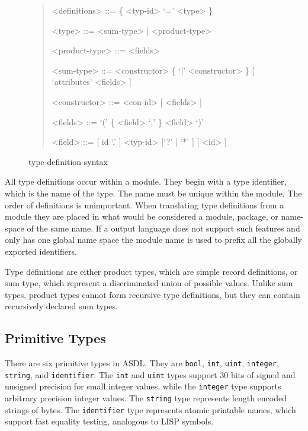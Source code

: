 \begin{figure}[t]
  \begin{quote}
    \begin{grammar}
      <definitions>  ::=  \{ <typ-id> `=' <type> \}

      <type>         ::= <sum-type> | <product-type>

      <product-type> ::= <fields>

      <sum-type>     ::= <constructor> \{ `|' <constructor> \} [ `attributes' <fields> ]

      <constructor>  ::= <con-id> [ <fields> ]

      <fields>       ::= `(' \{ <field>  `,' \} <field> `)'

      <field>        ::= [ id `.' ] <typ-id> [`?' | `*' ]  [ <id> ]
    \end{grammar}
  \end{quote}
  \caption{\asdl{} type definition syntax}
  \label{fig:type-syntax}
\end{figure}%

All type definitions occur within a module.  They begin with a type
identifier, which is the name of the type. The name must be unique within the
module. The order of definitions is unimportant. When translating type
definitions from a module they are placed in what would be considered a
module, package, or name-space of the same name. If a output language does
not support such features and only has one global name space the module name
is used to prefix all the globally exported identifiers.

Type definitions are either product types, which are simple record definitions,
or sum type, which represent a discriminated union of possible values. Unlike
sum types, product types cannot form recursive type definitions, but they can
contain recursively declared sum types.

\subsection{Primitive Types}
There are six primitive types in ASDL. They are
\lstinline!bool!, \lstinline!int!, \lstinline!uint!, \lstinline!integer!, \lstinline!string!,
and \lstinline!identifier!.
The \lstinline!int! and \lstinline!uint! types support 30 bits of signed and unsigned precision
for small integer values, while the \lstinline!integer! type supports arbitrary precision
integer values.
The \lstinline!string! type represents length encoded strings of bytes.
The \lstinline[language=ASDL]!identifier! type represents
atomic printable names, which support fast equality testing, analogous to
LISP symbols.

